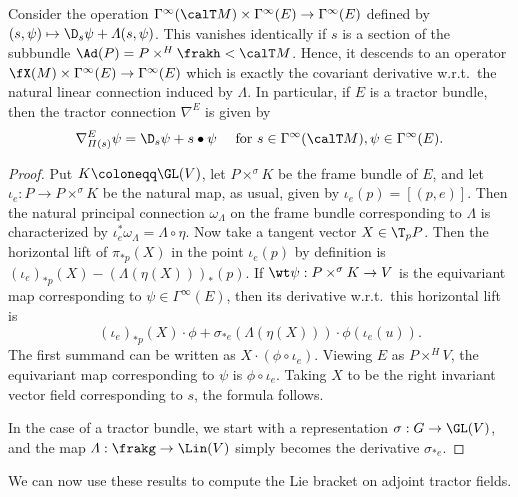  \begin{thm}\label{thm 1.5.8 Cap}
    Consider the operation $\Gamma^\infty(\calT M)\times\Gamma^\infty(E)\to \Gamma^\infty(E)$ defined by $(s,\psi)\mapsto \D_s\psi+\varLambda(s,\psi)$. This vanishes identically if $s$ is a section of the subbundle $\Ad(P)=P\times^H\frakh<\calT M$. Hence, it descends to an operator $\fX(M)\times \Gamma^\infty(E)\to \Gamma^\infty(E)$ which is exactly the covariant derivative w.r.t.\ the natural linear connection induced by $\varLambda$. In particular, if $E$ is a tractor bundle, then the tractor connection $\nabla^E$ is given by 
    \[\nabla^E_{\varPi(s)}\psi =\D_s \psi+s\bullet \psi \quad \text{ for }s\in\Gamma^\infty(\calT M),\psi\in\Gamma^\infty(E).\]
 \end{thm}
 \begin{proof}
    Put $K\coloneqq \GL(V)$, let $P\times^\sigma K$ be the frame bundle of $E$, and let $\iota_e:P\to P\times^\sigma K$ be the natural map, as usual, given by $\iota_e(p)=[(p,e)]$. Then the natural principal connection $\omega_\varLambda$ on the frame bundle corresponding to $\varLambda$ is characterized by $\iota_e^\ast\omega_\varLambda=\varLambda\circ\eta$. Now take a tangent vector $X\in \T_p P$. Then the horizontal lift of $\pi_{\ast p}(X)$ in the point $\iota_e(p)$ by definition is $(\iota_e)_{\ast p}(X)-(\varLambda(\eta(X)))_\ast(p)$. If $\wt\psi:P\times^\sigma K\to V$ is the equivariant map corresponding to $\psi\in\Gamma^\infty(E)$, then its derivative w.r.t.\ this horizontal lift is 
    \[(\iota_e)_{\ast p}(X)\cdot \phi+\sigma_{\ast e}(\varLambda(\eta(X)))\cdot \phi(\iota_e(u)).\]
    The first summand can be written as $X\cdot (\phi\circ\iota_e)$. Viewing $E$ as $P\times^H V$, the equivariant map corresponding to $\psi$ is $\phi\circ \iota_e$. Taking $X$ to be the right invariant vector field corresponding to $s$, the formula follows.

    In the case of a tractor bundle, we start with a representation $\sigma:G\to \GL(V)$, and the map $\varLambda:\frakg\to \Lin(V)$ simply becomes the derivative $\sigma_{\ast e}$.
 \end{proof}

 We can now use these results to compute the Lie bracket on adjoint tractor fields.

